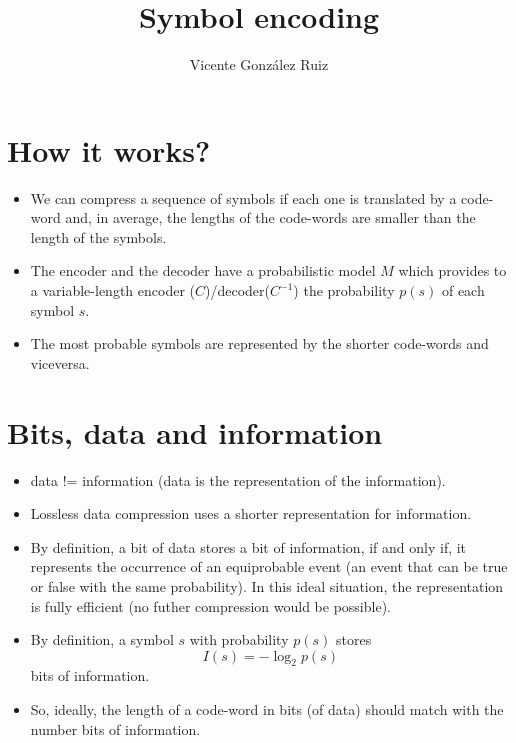
\title{Symbol encoding}

\author{Vicente González Ruiz}

\maketitle

\section{How it works?}
\begin{itemize}
\item
  We can compress a sequence of symbols if each one is translated by a
  code-word and, in average, the lengths of the code-words are smaller
  than the length of the symbols.
\item
  The encoder and the decoder have a probabilistic model \(M\) which
  provides to a variable-length encoder (\(C\))/decoder(\(C^{-1}\)) the
  probability \(p(s)\) of each symbol \(s\).
\item
  The most probable symbols are represented by the shorter code-words
  and viceversa.
\end{itemize}


\section{Bits, data and information}
\begin{itemize}
\item
  data != information (data is the representation of the information).
\item
  Lossless data compression uses a shorter representation for
  information.
\item
  By definition, a bit of data stores a bit of information, if and only
  if, it represents the occurrence of an equiprobable event (an event
  that can be true or false with the same probability). In this ideal
  situation, the representation is fully efficient (no futher
  compression would be possible).
\item
  By definition, a symbol \(s\) with probability \(p(s)\) stores
  \begin{equation}
    I(s)=-\log_2 p(s) \label{Eq:symbol_information} \tag{Eq:symbol\_information}
  \end{equation}
  bits of information.
\item
  So, ideally, the length of a code-word in bits (of data) should match
  with the number bits of information.
\end{itemize}

